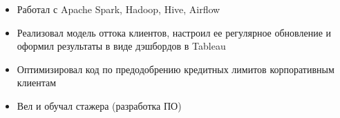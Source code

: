 \begin{itemize}
    \item Работал с Apache Spark, Hadoop, Hive, Airflow
    \item Реализовал модель оттока клиентов, настроил ее регулярное обновление и оформил результаты в виде дэшбордов в Tableau
    \item Оптимизировал код по предодобрению кредитных лимитов корпоративным клиентам
    \item Вел и обучал стажера (разработка ПО)
\end{itemize}
